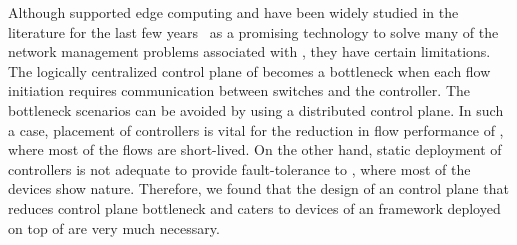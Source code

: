 Although  supported edge computing and  have been widely studied in the literature for the last few years~\cite{galluccio2015sdn,tang2018intelligent,baktir2017can} as a promising technology to solve many of the network management problems associated with , they have certain limitations. The logically centralized control plane of  becomes a bottleneck when each flow initiation requires communication between switches and the controller. The bottleneck scenarios can be avoided by using a distributed  control plane. In such a case, placement of controllers is vital for the reduction in flow performance of , where most of the flows are short-lived. On the other hand, static deployment of controllers is not adequate to provide fault-tolerance to , where most of the devices show  nature. Therefore, we found that the design of an  control plane that reduces control plane bottleneck and caters to  devices of an  framework deployed on top of  are very much necessary.




